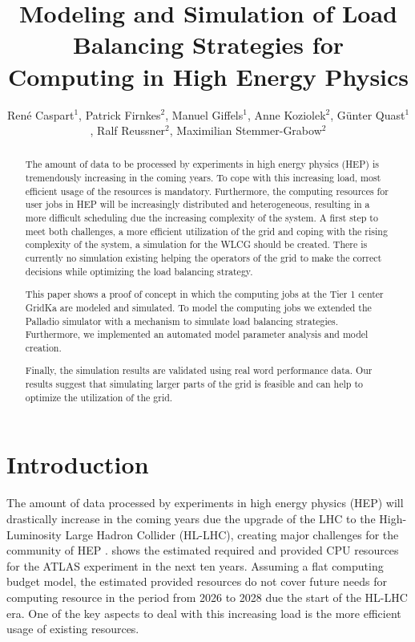 \documentclass[a4paper]{jpconf}
\begin{document}
\title{Modeling and Simulation of Load Balancing Strategies for Computing in High Energy Physics}

\author{Ren\'e Caspart${}^{1}$,
	Patrick Firnkes${}^{2}$,
	Manuel Giffels${}^{1}$,
	Anne Koziolek${}^{2}$,
	G\"unter Quast${}^{1}$,
	Ralf Reussner${}^{2}$, 
	Maximilian Stemmer-Grabow${}^{2}$}

\address{
	${}^{1}$Institute for Experimental Particle Physics (ETP) \\
	${}^{2}$Institute for Program Structures and Data Organization (IPD) \\
	at Karlsruhe Institute of Technology (KIT), Karlsruhe, Germany}


\begin{abstract}
	The amount of data to be processed by experiments in high energy physics (HEP) is tremendously increasing in the coming years. To cope with this increasing load, most efficient usage of the resources is mandatory. Furthermore, the computing resources for user jobs in HEP will be increasingly distributed and heterogeneous, resulting in a more difficult scheduling due the increasing complexity of the system. 
	A first step to meet both challenges, a more efficient utilization of the grid and coping with the rising complexity of the system, a simulation for the WLCG should be created. There is currently no simulation existing helping the operators of the grid to make the correct decisions while optimizing the load balancing strategy.
	
	This paper shows a proof of concept in which the computing jobs at the Tier 1 center GridKa are modeled and simulated. To model the computing jobs we extended the Palladio simulator with a mechanism to simulate load balancing strategies. Furthermore, we implemented an automated model parameter analysis and model creation.
	
	Finally, the simulation results are validated using real word performance data. Our results suggest that simulating larger parts of the grid is feasible and can help to optimize the utilization of the grid.
\end{abstract}


\section{Introduction}
\label{sec:intro}

The amount of data processed by experiments in high energy physics (HEP) will drastically increase in the coming years due the upgrade of the LHC to the High-Luminosity Large Hadron Collider (HL-LHC), creating major challenges for the community of HEP \cite{community}.
 shows the estimated required and provided CPU resources for the ATLAS experiment in the next ten years. Assuming a flat computing budget model, the estimated provided resources do not cover future needs for computing resource in the period from 2026 to 2028 due the start of the HL-LHC era. One of the key aspects to deal with this increasing load is the more efficient usage of existing resources.
\end{document}
